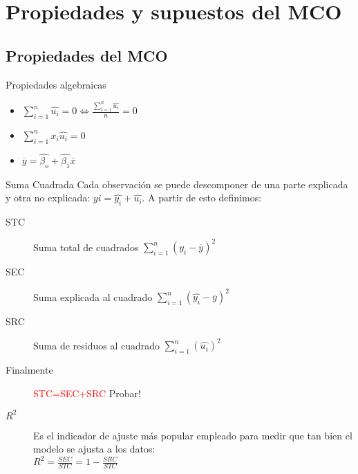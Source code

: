 \section{Propiedades y supuestos del MCO}

\subsection{Propiedades del MCO}
\begin{frame}{Propiedades algebraicas}
	\begin{itemize}
		\item $\sum_{i=1}^{n}\hat{u_{i}}=0 \Leftrightarrow \frac{\sum_{i=1}^{n}\hat{u_{i}}}{n}=0$
		\item $\sum_{i=1}^{n}x_{i}\hat{u_{i}}=0$
		\item $\overline{y}=\hat{\beta_{o}}+\hat{\beta_{1}}\overline{x}$
	\end{itemize}
\end{frame}
\begin{frame}{Suma Cuadrada}
	Cada observación se puede descomponer de una parte explicada y otra no explicada: $y{i}=\hat{y_{i}}+\hat{u_{i}}$. A partir de esto definimos:
		\begin{description}
			\item[STC] Suma total de cuadrados $\sum_{i=1}^{n}(y_{i}-\overline{y})^{2}$
			\item[SEC] Suma explicada al cuadrado $\sum_{i=1}^{n}(\hat{y_{i}}-\overline{y})^{2}$
			\item[SRC] Suma de residuos al cuadrado $\sum_{i=1}^{n}(\hat{u_{i}})^{2}$
			\item[Finalmente] \textcolor{red}{STC=SEC+SRC} Probar!
			\item[$R^{2}$] Es el indicador de ajuste más popular empleado para medir que tan bien el modelo se ajusta a los datos:\\
			$R^{2}=\frac{SEC}{STC}=1-\frac{SRC}{STC}$
		\end{description}
\end{frame}

